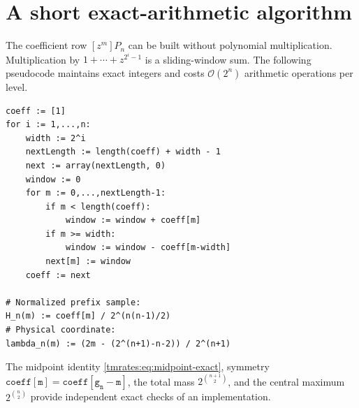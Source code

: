 \documentclass[11pt,oneside]{article}
\theoremstyle{definition}
\theoremstyle{remark}
\newcommand{\bigO}{\mathcal O}
\begin{document}
\section{A short exact-arithmetic algorithm}
\label{tmrates:app:algorithm}

The coefficient row $[z^m]P_n$ can be built without polynomial multiplication.  Multiplication
by $1+\cdots+z^{2^i-1}$ is a sliding-window sum.  The following pseudocode maintains exact
integers and costs $\bigO(2^n)$ arithmetic operations per level.

\begin{lstlisting}[style=pseudo]
coeff := [1]
for i := 1,...,n:
    width := 2^i
    nextLength := length(coeff) + width - 1
    next := array(nextLength, 0)
    window := 0
    for m := 0,...,nextLength-1:
        if m < length(coeff):
            window := window + coeff[m]
        if m >= width:
            window := window - coeff[m-width]
        next[m] := window
    coeff := next

# Normalized prefix sample:
H_n(m) := coeff[m] / 2^(n(n-1)/2)
# Physical coordinate:
lambda_n(m) := (2m - (2^(n+1)-n-2)) / 2^(n+1)
\end{lstlisting}

The midpoint identity \eqref{tmrates:eq:midpoint-exact}, symmetry
$\mathtt{coeff[m]}=\mathtt{coeff[g_n-m]}$, the total mass
$2^{\binom{n+1}{2}}$, and the central maximum $2^{\binom n2}$ provide independent exact
checks of an implementation.
\end{document}
